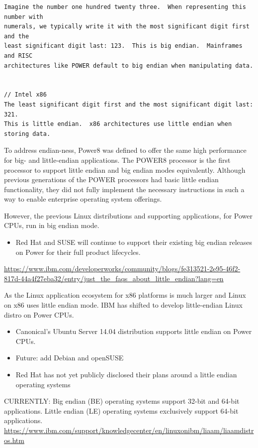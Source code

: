 \begin{verbatim}
Imagine the number one hundred twenty three.  When representing this number with
numerals, we typically write it with the most significant digit first and the
least significant digit last: 123.  This is big endian.  Mainframes and RISC
architectures like POWER default to big endian when manipulating data.


// Intel x86
The least significant digit first and the most significant digit last: 321. 
This is little endian.  x86 architectures use little endian when storing data.
\end{verbatim}

To address endian-ness, Power8 was defined to offer the same high performance
for big- and little-endian applications. The POWER8 processor is the first
processor to support little endian and big endian modes equivalently. Although
previous generations of the POWER processors had basic little endian
functionality, they did not fully implement the necessary instructions in such a
way to enable enterprise operating system offerings.   


However, the previous Linux distributions and supporting applications, for Power
CPUs, run in big endian mode.
\begin{itemize}
  \item   Red Hat and SUSE will continue to support their existing big endian
  releases on Power for their full product lifecycles.
\end{itemize}
\url{https://www.ibm.com/developerworks/community/blogs/fe313521-2e95-46f2-817d-44a4f27eba32/entry/just_the_faqs_about_little_endian?lang=en}


As the Linux application ecosystem for x86 platforms is much larger and Linux
on x86 uses little endian mode. IBM has shifted to develop  little-endian Linux
distro on Power CPUs. 
\begin{itemize}
  \item   Canonical's Ubuntu Server 14.04 distribution supports little endian on
  Power CPUs.
  
  \item Future: add Debian and openSUSE 
  
  \item Red Hat has not yet publicly disclosed their plans around a little
  endian operating systems  
\end{itemize}

CURRENTLY:  Big endian (BE) operating systems support 32-bit and 64-bit
applications. Little endian (LE) operating systems exclusively support 64-bit
applications.
\url{https://www.ibm.com/support/knowledgecenter/en/linuxonibm/liaam/liaamdistros.htm}

